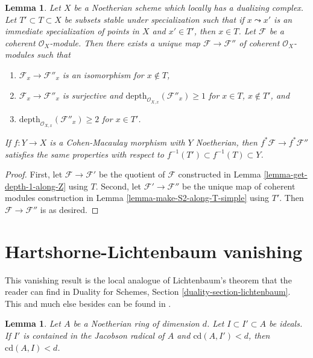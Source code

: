 \documentclass{stacks-project}
\theoremstyle{plain}
\newtheorem{lemma}[subsection]{Lemma}
\theoremstyle{definition}
\theoremstyle{remark}
\numberwithin{equation}{subsection}
\begin{document}
\begin{lemma}
\label{lemma-make-S2-along-T}
Let $X$ be a Noetherian scheme which locally has a dualizing complex.
Let $T' \subset T \subset X$ be subsets stable under specialization
such that if $x \leadsto x'$ is an immediate specialization
of points in $X$ and $x' \in T'$, then $x \in T$. Let $\mathcal{F}$
be a coherent $\mathcal{O}_X$-module.
Then there exists a unique map $\mathcal{F} \to \mathcal{F}''$
of coherent $\mathcal{O}_X$-modules such that
\begin{enumerate}
\item $\mathcal{F}_x \to \mathcal{F}''_x$ is an isomorphism
for $x \not \in T$,
\item $\mathcal{F}_x \to \mathcal{F}''_x$ is surjective
and $\text{depth}_{\mathcal{O}_{X, x}}(\mathcal{F}''_x) \geq 1$
for $x \in T$, $x \not \in T'$, and
\item $\text{depth}_{\mathcal{O}_{X, x}}(\mathcal{F}''_x) \geq 2$
for $x \in T'$.
\end{enumerate}
If $f : Y \to X$ is a Cohen-Macaulay morphism with $Y$ Noetherian,
then $f^*\mathcal{F} \to f^*\mathcal{F}''$ satisfies the same properties
with respect to $f^{-1}(T') \subset f^{-1}(T) \subset Y$.
\end{lemma}

\begin{proof}
First, let $\mathcal{F} \to \mathcal{F}'$ be the quotient of $\mathcal{F}$
constructed in Lemma \ref{lemma-get-depth-1-along-Z} using $T$.
Second, let $\mathcal{F}' \to \mathcal{F}''$ be the unique
map of coherent modules construction in
Lemma \ref{lemma-make-S2-along-T-simple} using $T'$.
Then $\mathcal{F} \to \mathcal{F}''$ is as desired.
\end{proof}










\section{Hartshorne-Lichtenbaum vanishing}
\label{section-Hartshorne-Lichtenbaum-vanishing}

\noindent
This vanishing result is the local analogue of
Lichtenbaum's theorem that the reader can find
in Duality for Schemes, Section \ref{duality-section-lichtenbaum}.
This and much else besides can be found in \cite{CD}.

\begin{lemma}
\label{lemma-cd-top-vanishing}
Let $A$ be a Noetherian ring of dimension $d$. Let $I \subset I' \subset A$
be ideals. If $I'$ is contained in the Jacobson radical
of $A$ and $\text{cd}(A, I') < d$, then $\text{cd}(A, I) < d$.
\end{lemma}
\end{document}
